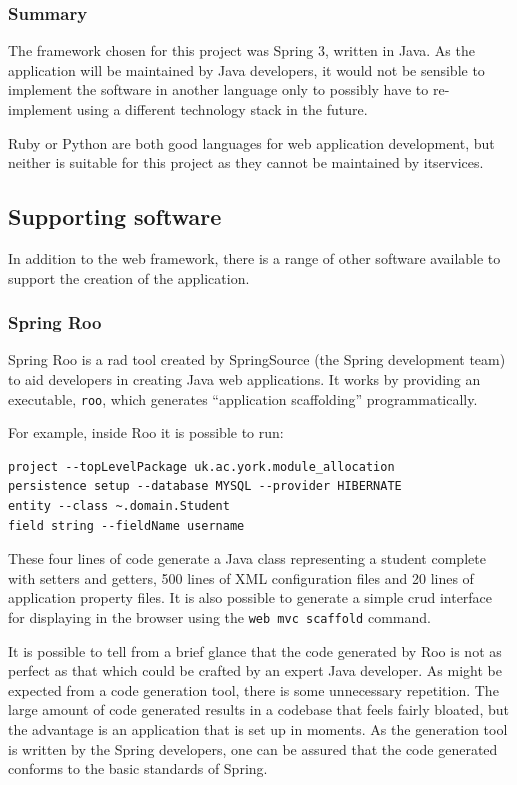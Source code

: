 \documentclass[draft]{scrartcl}
\begin{document}
\subsubsection{Summary}

The framework chosen for this project was Spring 3, written in Java. As the
application will be maintained by Java developers, it would not be sensible to
implement the software in another language only to possibly have to
re-implement using a different technology stack in the future.

Ruby or Python are both good languages for web application development, but
neither is suitable for this project as they cannot be maintained by
\gls{itservices}.

\subsection{Supporting software}

In addition to the web framework, there is a range of other software available
to support the creation of the application.

\subsubsection{Spring Roo}

Spring Roo is a \gls{rad} tool created by SpringSource (the Spring development team) to
aid developers in creating Java web applications. It works by providing an
executable, \texttt{roo}, which generates ``application scaffolding''
programmatically.

For example, inside Roo it is possible to run:

\begin{lstlisting}
project --topLevelPackage uk.ac.york.module_allocation
persistence setup --database MYSQL --provider HIBERNATE
entity --class ~.domain.Student
field string --fieldName username
\end{lstlisting}

These four lines of code generate a Java class representing a student complete
with setters and getters, 500 lines of XML configuration files and 20 lines of
application property files. It is also possible to generate a simple
\gls{crud} interface for displaying in the browser using the \texttt{web mvc
scaffold} command.

It is possible to tell from a brief glance that the code generated by Roo is
not as perfect as that which could be crafted by an expert Java developer. As
might be expected from a code generation tool, there is some unnecessary
repetition. The large amount of code generated results in a codebase that
feels fairly bloated, but the advantage is an application that is set up in
moments. As the generation tool is written by the Spring developers, one can
be assured that the code generated conforms to the basic standards of Spring.
\end{document}
